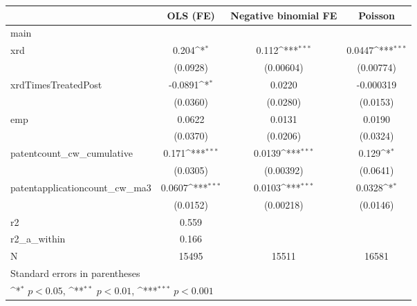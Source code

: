 {
\def\sym#1{\ifmmode^{#1}\else\(^{#1}\)\fi}
\begin{tabular}{l*{3}{c}}
\hline\hline
            &\multicolumn{1}{c}{OLS (FE)}&\multicolumn{1}{c}{Negative binomial FE}&\multicolumn{1}{c}{Poisson}\\
\hline
main        &                     &                     &                     \\
xrd         &       0.204\sym{*}  &       0.112\sym{***}&      0.0447\sym{***}\\
            &    (0.0928)         &   (0.00604)         &   (0.00774)         \\
[1em]
xrdTimesTreatedPost&     -0.0891\sym{*}  &      0.0220         &   -0.000319         \\
            &    (0.0360)         &    (0.0280)         &    (0.0153)         \\
[1em]
emp         &      0.0622         &      0.0131         &      0.0190         \\
            &    (0.0370)         &    (0.0206)         &    (0.0324)         \\
[1em]
patentcount\_cw\_cumulative&       0.171\sym{***}&      0.0139\sym{***}&       0.129\sym{*}  \\
            &    (0.0305)         &   (0.00392)         &    (0.0641)         \\
[1em]
patentapplicationcount\_cw\_ma3&      0.0607\sym{***}&      0.0103\sym{***}&      0.0328\sym{*}  \\
            &    (0.0152)         &   (0.00218)         &    (0.0146)         \\
\hline
r2          &       0.559         &                     &                     \\
r2\_a\_within &       0.166         &                     &                     \\
N           &       15495         &       15511         &       16581         \\
\hline\hline
\multicolumn{4}{l}{\footnotesize Standard errors in parentheses}\\
\multicolumn{4}{l}{\footnotesize \sym{*} \(p<0.05\), \sym{**} \(p<0.01\), \sym{***} \(p<0.001\)}\\
\end{tabular}
}
